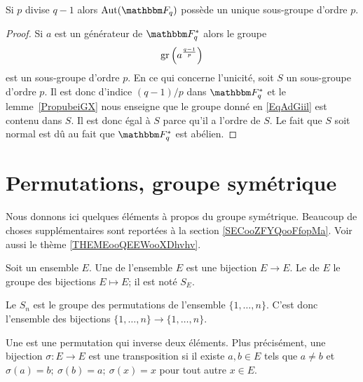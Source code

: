 \begin{corollary}       \label{CorwgmoTK}
    Si \( p\) divise \( q-1\) alors \( \Aut(\eF_q)\) possède un unique sous-groupe d'ordre \( p\).
\end{corollary}

\begin{proof}
    Si \( a\) est un générateur de \( \eF_q^*\) alors le groupe
    \begin{equation}    \label{EqAdGiil}
        \operatorname{gr}\left( a^{\frac{ q-1 }{ p }} \right)
    \end{equation}
    est un sous-groupe d'ordre \( p\). En ce qui concerne l'unicité, soit \( S\) un sous-groupe d'ordre \( p\). Il est donc d'indice \( (q-1)/p\) dans \( \eF_q^*\) et le lemme~\ref{PropubeiGX} nous enseigne que le groupe donné en \eqref{EqAdGiil} est contenu dans \( S\). Il est donc égal à \( S\) parce qu'il a l'ordre de \( S\). Le fait que \( S\) soit normal est dû au fait que \( \eF_q^*\) est abélien.
\end{proof}

\section{Permutations, groupe symétrique}

Nous donnons ici quelques éléments à propos du groupe symétrique. Beaucoup de choses supplémentaires sont reportées à la section \ref{SECooZFYQooFfopMa}. Voir aussi le thème \ref{THEMEooQEEWooXDhvhv}.

\begin{definition}      \label{DEFooJNPIooMuzIXd}
    Soit un ensemble \( E\). Une  de l'ensemble \( E\) est une bijection \( E\to E\). Le  de \( E\) le groupe des bijections \( E\mapsto E\); il est noté \( S_E\).

    Le  \( S_n\) est le groupe des permutations de l'ensemble \( \{ 1,\ldots,n \}\). C'est donc l'ensemble des bijections \( \{ 1,\ldots, n \}\to\{ 1,\ldots, n \}\).
\end{definition}

\begin{definition}      \label{DEFooXNAFooGTbTTJ}
    Une  est une permutation qui inverse deux éléments. Plus précisément, une bijection \( \sigma\colon E\to E\) est une transposition si il existe \( a,b\in E\) tels que \( a \neq b \) et \( \sigma (a) = b;\ \sigma(b) = a;\ \sigma(x) = x \) pour tout autre \( x \in E \).
\end{definition}

